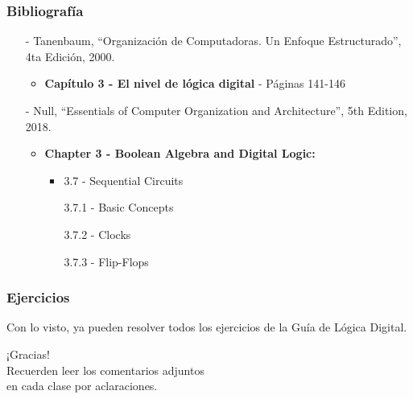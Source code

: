 \documentclass[aspectratio=169]{beamer}
\begin{document}
\begin{frame}[fragile]
    \frametitle{Bibliografía}
    \begin{itemize}
     \setlength\itemsep{0.5cm}
    \item[-] \small Tanenbaum, “Organización de Computadoras. Un Enfoque Estructurado”, 4ta Edición, 2000.\\
    \begin{itemize}
     \item \textbf{Capítulo 3 - El nivel de lógica digital} - Páginas 141-146
    \end{itemize}
    \item[-] \small Null, “Essentials of Computer Organization and Architecture”, 5th Edition, 2018.\\
    \begin{itemize}
     \item \textbf{Chapter 3 - Boolean Algebra and Digital Logic:}
     \begin{itemize}
     \item 3.7 - Sequential Circuits
        \item[] 3.7.1 - Basic Concepts
        \item[] 3.7.2 - Clocks
        \item[] 3.7.3 - Flip-Flops
     \end{itemize}
    \end{itemize}
    \end{itemize}
\end{frame}

\begin{frame}[fragile]
    \frametitle{Ejercicios}
    Con lo visto, ya pueden resolver todos los ejercicios de la Guía de Lógica Digital.
\end{frame}

\begin{frame}[plain]
    \begin{center}
    \vspace{2cm}
    \huge ¡Gracias!\\
    \vspace{2cm}
    \normalsize Recuerden leer los comentarios adjuntos\\ en cada clase por aclaraciones.
    \end{center}
\end{frame}
\end{document}
